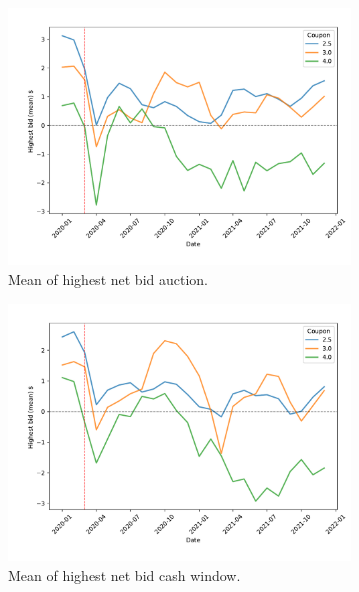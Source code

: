 \documentclass[11pt,a4paper]{article}
\begin{document}
\begin{figure}[]
\begin{subfigure}[b]{0.49\textwidth}
      \includegraphics[width=0.998\textwidth]{../results/figures/winner_bid_mean_mat30_loan1_timeseries_cpmonthly_2.5_4_auction_netbid.pdf}
      \caption{ Mean of highest net bid auction.}
     \end{subfigure}
     \begin{subfigure}[b]{0.49\textwidth}
      \includegraphics[width=0.998\textwidth]{../results/figures/winner_bid_mean_mat30_loan1_timeseries_cpmonthly_2.5_4_cash_window_netbid.pdf}
      \caption{ Mean of highest net bid cash window.}
     \end{subfigure}
     \begin{subfigure}[b]{0.49\textwidth}

\end{subfigure}
\end{figure}
\end{document}
